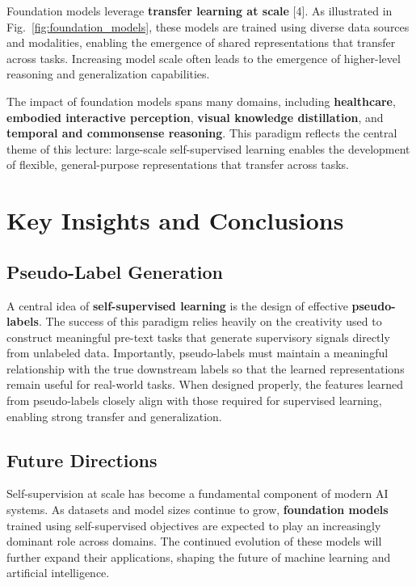\documentclass{article}
\renewcommand{\cite}[1]{[#1]}
\begin{document}
Foundation models leverage \textbf{transfer learning at scale} \cite{4}. As illustrated in Fig.~\ref{fig:foundation_models}, these models are trained using diverse data sources and modalities, enabling the emergence of shared representations that transfer across tasks. Increasing model scale often leads to the emergence of higher-level reasoning and generalization capabilities.

The impact of foundation models spans many domains, including \textbf{healthcare}, \textbf{embodied interactive perception}, \textbf{visual knowledge distillation}, and \textbf{temporal and commonsense reasoning}. This paradigm reflects the central theme of this lecture: large-scale self-supervised learning enables the development of flexible, general-purpose representations that transfer across tasks.

\section{Key Insights and Conclusions}

\subsection{Pseudo-Label Generation}

A central idea of \textbf{self-supervised learning} is the design of effective \textbf{pseudo-labels}. The success of this paradigm relies heavily on the creativity used to construct meaningful pre-text tasks that generate supervisory signals directly from unlabeled data. Importantly, pseudo-labels must maintain a meaningful relationship with the true downstream labels so that the learned representations remain useful for real-world tasks. When designed properly, the features learned from pseudo-labels closely align with those required for supervised learning, enabling strong transfer and generalization.

\subsection{Future Directions}

Self-supervision at scale has become a fundamental component of modern AI systems. As datasets and model sizes continue to grow, \textbf{foundation models} trained using self-supervised objectives are expected to play an increasingly dominant role across domains. The continued evolution of these models will further expand their applications, shaping the future of machine learning and artificial intelligence.
\end{document}
